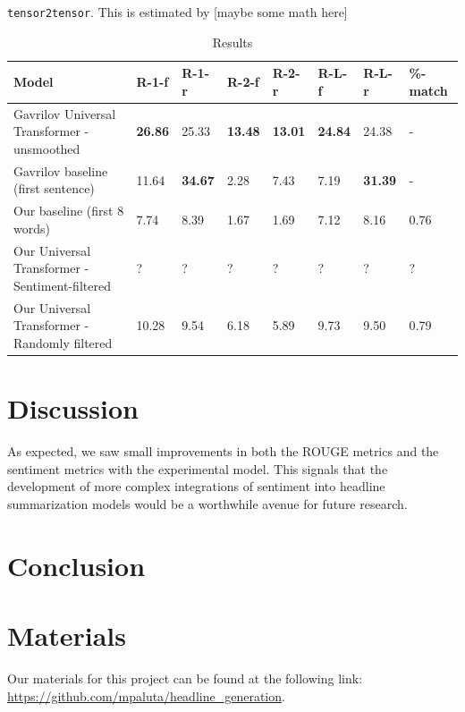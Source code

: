 \documentclass[11pt]{article}
\begin{document}
 \texttt{tensor2tensor}. This is estimated by [maybe some math here]

\begin{table}[h!]
\centering
\begin{small}
\begin{tabular}{|p{7cm}|p{.8cm}|p{.8cm}|p{.8cm}|p{.8cm}|p{.8cm}|p{.8cm}|p{1.3cm}|}
 \hline
 Model & R-1-f & R-1-r & R-2-f & R-2-r & R-L-f & R-L-r & \%-match \\
 \hline
 Gavrilov Universal Transformer - unsmoothed & \textbf{26.86} & 25.33 & \textbf{13.48} & \textbf{13.01} & \textbf{24.84} & 24.38 & - \\ [0.5ex] 
 Gavrilov baseline (first sentence) & 11.64 & \textbf{34.67} & 2.28 & 7.43 & 7.19 & \textbf{31.39} & - \\ 
 Our baseline (first 8 words) & 7.74 & 8.39 & 1.67 & 1.69 & 7.12 & 8.16 & 0.76 \\
 Our Universal Transformer - Sentiment-filtered & ? & ? & ? & ? & ? & ? & ? \\
 Our Universal Transformer - Randomly filtered & 10.28 & 9.54 & 6.18 & 5.89 & 9.73 & 9.50 & 0.79 \\ [1ex]
 \hline
\end{tabular}
\end{small}
\caption{Results}
\label{table:results}
\end{table}

\section{Discussion}

As expected, we saw small improvements in both the ROUGE metrics and the sentiment metrics with the experimental model. This signals that the development of more complex integrations of sentiment into headline summarization models would be a worthwhile avenue for future research. 

\section{Conclusion}



\section{Materials}
Our materials for this project can be found at the following link:
\url{https://github.com/mpaluta/headline_generation}.
\end{document}
